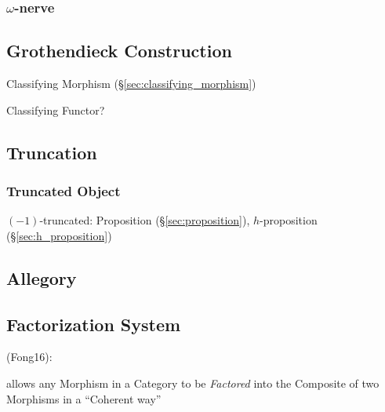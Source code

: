 \subsubsection{$\omega$-nerve}\label{sec:omega_nerve}



\subsection{Grothendieck Construction}
\label{sec:grothendieck_construction}

Classifying Morphism (\S\ref{sec:classifying_morphism})

Classifying Functor?



\subsection{Truncation}\label{sec:truncation}

\subsubsection{Truncated Object}\label{sec:truncated_object}

$(-1)$-truncated: Proposition (\S\ref{sec:proposition}),
$h$-proposition (\S\ref{sec:h_proposition})



\subsection{Allegory}\label{sec:allegory}

\subsection{Factorization System}\label{sec:factorization_system}

(Fong16):

allows any Morphism in a Category to be \emph{Factored} into the
Composite of two Morphisms in a ``Coherent way'' %

